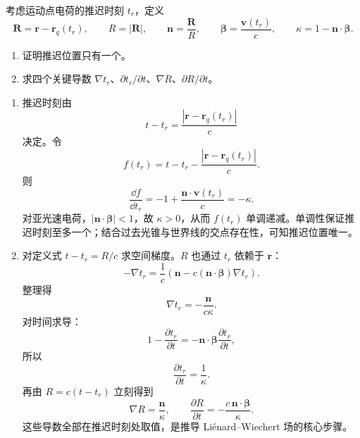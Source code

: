 \begin{question}
考虑运动点电荷的推迟时刻 $t_r$，定义
\[
  \mathbf R=\mathbf r-\mathbf r_q(t_r),
  \qquad R=|\mathbf R|,
  \qquad \mathbf n=\frac{\mathbf R}{R},
  \qquad \boldsymbol\beta=\frac{\mathbf v(t_r)}{c},
  \qquad \kappa=1-\mathbf n\cdot\boldsymbol\beta .
\]
\begin{enumerate}
  \item 证明推迟位置只有一个。
  \item 求四个关键导数 $\nabla t_r$、$\partial t_r/\partial t$、$\nabla R$、$\partial R/\partial t$。
\end{enumerate}
\begin{solution}
\begin{enumerate}
  \item 推迟时刻由
  \[
    t-t_r=\frac{|\mathbf r-\mathbf r_q(t_r)|}{c}
  \]
  决定。令
  \[
    f(t_r)=t-t_r-\frac{|\mathbf r-\mathbf r_q(t_r)|}{c} .
  \]
  则
  \[
    \frac{\dd{f}}{\dd{t_r}}
    =-1+\frac{\mathbf n\cdot\mathbf v(t_r)}{c}
    =-\kappa .
  \]
  对亚光速电荷，$|\mathbf n\cdot\boldsymbol\beta|<1$，故 $\kappa>0$，从而 $f(t_r)$ 单调递减。单调性保证推迟时刻至多一个；结合过去光锥与世界线的交点存在性，可知推迟位置唯一。

  \item 对定义式 $t-t_r=R/c$ 求空间梯度。$R$ 也通过 $t_r$ 依赖于 $\mathbf r$：
  \[
    -\nabla t_r=\frac1c\left(\mathbf n-c(\mathbf n\cdot\boldsymbol\beta)\nabla t_r\right).
  \]
  整理得
  \[
    \boxed{\nabla t_r=-\frac{\mathbf n}{c\kappa}} .
  \]
  对时间求导：
  \[
    1-\frac{\partial t_r}{\partial t}
    =-\mathbf n\cdot\boldsymbol\beta\frac{\partial t_r}{\partial t},
  \]
  所以
  \[
    \boxed{\frac{\partial t_r}{\partial t}=\frac1\kappa} .
  \]
  再由 $R=c(t-t_r)$ 立刻得到
  \[
    \boxed{\nabla R=\frac{\mathbf n}{\kappa}},
    \qquad
    \boxed{\frac{\partial R}{\partial t}=-\frac{c\,\mathbf n\cdot\boldsymbol\beta}{\kappa}} .
  \]
  这些导数全部在推迟时刻处取值，是推导 Liénard--Wiechert 场的核心步骤。
\end{enumerate}
\end{solution}
\end{question}


